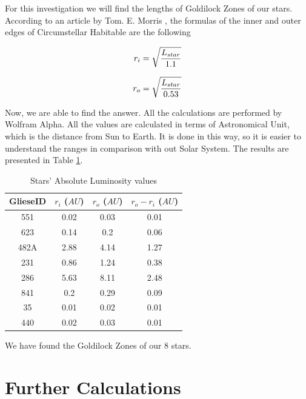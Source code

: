 \documentclass{article}
\begin{document}
For this investigation we will find the lengths of Goldilock Zones of our stars. According to an article by Tom. E. Morris \cite{habz}, the formulas of the inner and outer edges of Circumstellar Habitable are the following

\begin{equation}
  r_i = \sqrt{\frac{L_{star}}{1.1}}\\
  \end{equation}

\begin{equation}
  r_o = \sqrt{\frac{L_{star}}{0.53}}\\
  \end{equation}

Now, we are able to find the answer. All the calculations are performed by Wolfram Alpha. All the values are calculated in terms of Astronomical Unit, which is the distance from Sun to Earth. It is done in this way, so it is easier to understand the ranges in comparison with out Solar System. The results are presented in Table \ref{chz}.


\begin{table}[h]
    \begin{center}
      \caption{Stars' Absolute Luminosity values}
      \begin{tabular}{c | c | c | c}
        \textbf{GlieseID} & \textbf{$r_i$} \textbf{($AU$)} & \textbf{$r_o$} \textbf{($AU$)} & \textbf{$r_o - r_i$} \textbf{($AU$)}\\
        \hline
        551 & 0.02 & 0.03 & 0.01\\
        623 & 0.14 & 0.2 & 0.06\\
        482A & 2.88 & 4.14 & 1.27\\
        231 & 0.86 & 1.24 & 0.38\\
        286 & 5.63 & 8.11 & 2.48\\
        841 & 0.2 & 0.29 & 0.09\\
        35 & 0.01 & 0.02 & 0.01\\
        440 & 0.02 & 0.03 & 0.01\\
      \end{tabular}
      \label{chz}
    \end{center}
  \end{table}

We have found the Goldilock Zones of our 8 stars.

\section{Further Calculations}
\end{document}
